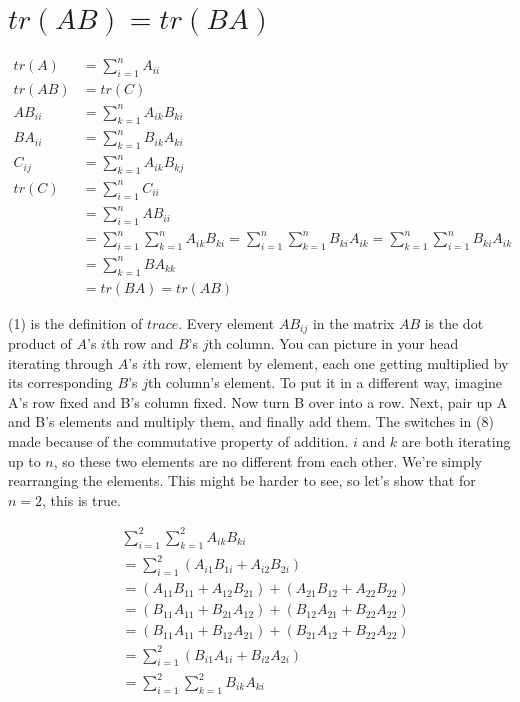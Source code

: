 \documentclass[a4paper, 12pt]{article}
\begin{document}
\section{\(tr(AB) = tr(BA) \)}
\begin{align}
tr(A)    & = \sum_{i=1}^n A_{ii}\\
tr(AB) & = tr(C)\\
AB_{ii} & = \sum_{k=1}^nA_{ik}B_{ki}\\
BA_{ii} & = \sum_{k=1}^nB_{ik}A_{ki}\\
C_{ij}  & = \sum_{k=1}^nA_{ik}B_{kj}\\
tr(C)   & = \sum_{i=1}^nC_{ii}\\
& = \sum_{i=1}^nAB_{ii}\\
& = \sum_{i=1}^n\sum_{k=1}^nA_{ik}B_{ki} = \sum_{i=1}^n\sum_{k=1}^nB_{ki}A_{ik} = \sum_{k=1}^n\sum_{i=1}^nB_{ki}A_{ik}\\
& = \sum_{k=1}^nBA_{kk}\\
& = tr(BA) = tr(AB)
\end{align}

(1) is the definition of $trace$. Every element $AB_{ij}$ in the matrix $AB$ is the dot product of $A$'s $i$th row and $B$'s $j$th column. You can picture in your head iterating through $A$'s $i$th row, element by element, each one getting multiplied by its corresponding $B$'s $j$th column's element. To put it in a different way, imagine A's row fixed and B's column fixed. Now turn B over into a row. Next, pair up A and B's elements and multiply them, and finally add them. The switches in (8) made because of the commutative property of addition. $i$ and $k$ are both iterating up to $n$, so these two elements are no different from each other. We're simply rearranging the elements. This might be harder to see, so let's show that for $n = 2$, this is true.

\begin{align*}
& \sum_{i=1}^2\sum_{k=1}^2A_{ik}B_{ki}\\
& = \sum_{i=1}^2(A_{i1}B_{1i} + A_{i2}B_{2i})\\
& = (A_{11}B_{11} + A_{12}B_{21}) + (A_{21}B_{12} + A_{22}B_{22})\\
& = (B_{11}A_{11} + B_{21}A_{12 }) + (B_{12}A_{21} + B_{22}A_{22})\\
& = (B_{11}A_{11} + B_{12}A_{21}) + (B_{21}A_{12 } + B_{22}A_{22})\\
& = \sum_{i=1}^2(B_{i1}A_{1i} + B_{i2}A_{2i})\\
&= \sum_{i=1}^2\sum_{k=1}^2B_{ik}A_{ki}\\
\end{align*}
\end{document}
